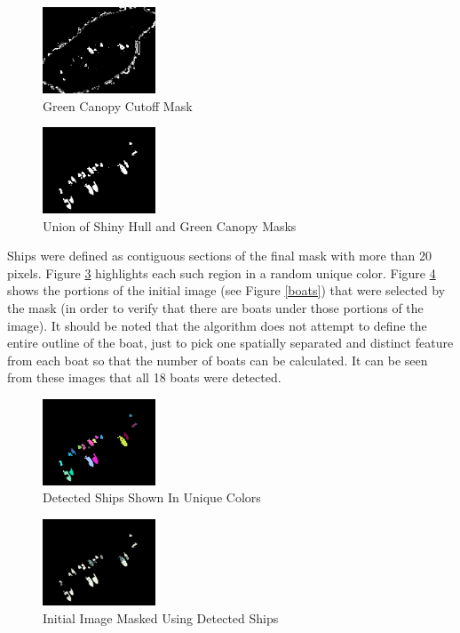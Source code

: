 \documentclass[12pt]{article}
\begin{document}
\begin{figure}
\centering
\includegraphics[width=0.30\textwidth]{mask_green_canopy.png}
\caption{Green Canopy Cutoff Mask}
\label{maskgreencanopy}
\end{figure}

\begin{figure}
\centering
\includegraphics[width=0.30\textwidth]{mask_almost_final.png}
\caption{Union of Shiny Hull and Green Canopy Masks}
\label{maskalmostfinal}
\end{figure}

Ships were defined as contiguous sections of the final mask with more than 20 pixels. Figure \ref{finalcolor} highlights each such region in a random unique color. Figure \ref{finalmask} shows the portions of the initial image (see Figure \ref{boats}) that were selected by the mask (in order to verify that there are boats under those portions of the image). It should be noted that the algorithm does not attempt to define the entire outline of the boat, just to pick one spatially separated and distinct feature from each boat so that the number of boats can be calculated. It can be seen from these images that all 18 boats were detected.

\begin{figure}
\centering
\includegraphics[width=0.30\textwidth]{final_color.png}
\caption{Detected Ships Shown In Unique Colors}
\label{finalcolor}
\end{figure}

\begin{figure}
\centering
\includegraphics[width=0.30\textwidth]{final_mask.png}
\caption{Initial Image Masked Using Detected Ships }
\label{finalmask}
\end{figure}
\end{document}
